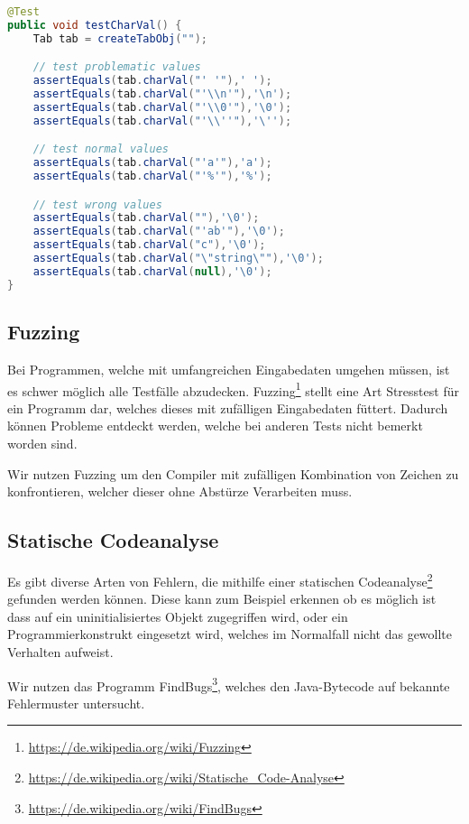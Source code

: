 \begin{lstlisting}[language=Java]
@Test
public void testCharVal() {
	Tab tab = createTabObj("");

	// test problematic values
	assertEquals(tab.charVal("' '"),' ');
	assertEquals(tab.charVal("'\\n'"),'\n');
	assertEquals(tab.charVal("'\\0'"),'\0');
	assertEquals(tab.charVal("'\\''"),'\'');

	// test normal values
	assertEquals(tab.charVal("'a'"),'a');
	assertEquals(tab.charVal("'%'"),'%');

	// test wrong values
	assertEquals(tab.charVal(""),'\0');
	assertEquals(tab.charVal("'ab'"),'\0');
	assertEquals(tab.charVal("c"),'\0');
	assertEquals(tab.charVal("\"string\""),'\0');
	assertEquals(tab.charVal(null),'\0');
}
\end{lstlisting}

\subsection{Fuzzing}

Bei Programmen, welche mit umfangreichen Eingabedaten umgehen m\"ussen, ist es schwer m\"oglich alle Testf\"alle abzudecken. Fuzzing\footnote{\url{https://de.wikipedia.org/wiki/Fuzzing}} stellt eine Art \glqq{}Stresstest\grqq{} f\"ur ein Programm dar, welches dieses mit zuf\"alligen Eingabedaten f\"uttert. Dadurch k\"onnen Probleme entdeckt werden, welche bei anderen Tests nicht bemerkt worden sind.

Wir nutzen Fuzzing um den Compiler mit zuf\"alligen Kombination von Zeichen zu konfrontieren, welcher dieser ohne Abst\"urze Verarbeiten muss.

\subsection{Statische Codeanalyse}

Es gibt diverse Arten von Fehlern, die mithilfe einer statischen Codeanalyse\footnote{\url{https://de.wikipedia.org/wiki/Statische_Code-Analyse}} gefunden werden k\"onnen. Diese kann zum Beispiel erkennen ob es m\"oglich ist dass auf ein uninitialisiertes Objekt zugegriffen wird, oder ein Programmierkonstrukt eingesetzt wird, welches im Normalfall nicht das gewollte Verhalten aufweist.

Wir nutzen das Programm FindBugs\footnote{\url{https://de.wikipedia.org/wiki/FindBugs}}, welches den Java-Bytecode auf bekannte Fehlermuster untersucht.

